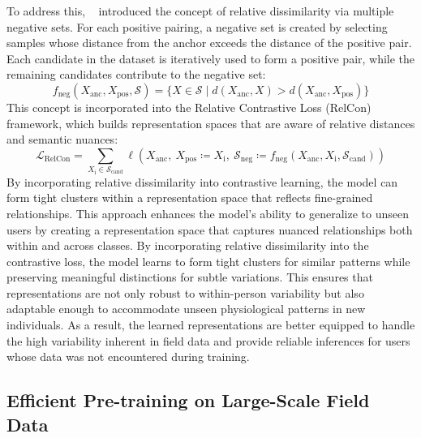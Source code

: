 To address this, ~\cite{xu2024relcon} introduced the concept of relative dissimilarity via multiple negative sets. For each positive pairing, a negative set is created by selecting samples whose distance from the anchor exceeds the distance of the positive pair. Each candidate in the dataset is iteratively used to form a positive pair, while the remaining candidates contribute to the negative set:
\[
f_{\textrm{neg}}({X}_{\textrm{anc}}, {X}_{\textrm{pos}}, \mathcal{S}) = \{{X} \in \mathcal{S} \mid d({X}_{\textrm{anc}}, {X}) > d({X}_{\textrm{anc}}, {X}_{\textrm{pos}}) \}
\]
This concept is incorporated into the Relative Contrastive Loss (RelCon) framework, which builds representation spaces that are aware of relative distances and semantic nuances:
\[
\mathcal{L}_{\textrm{RelCon}} = \sum_{{X}_{\textrm{i}} \in \mathcal{S}_{\textrm{cand}}} \ell({X}_{\textrm{anc}},\ {X}_{\textrm{pos}} \coloneqq {X}_{\textrm{i}},\ \mathcal{S}_{\textrm{neg}} \coloneqq f_{\textrm{neg}}({X}_{\textrm{anc}}, {X}_{\textrm{i}}, \mathcal{S}_{\textrm{cand}}))
\]
By incorporating relative dissimilarity into contrastive learning, the model can form tight clusters within a representation space that reflects fine-grained relationships. This approach enhances the model's ability to generalize to unseen users by creating a representation space that captures nuanced relationships both within and across classes. By incorporating relative dissimilarity into the contrastive loss, the model learns to form tight clusters for similar patterns while preserving meaningful distinctions for subtle variations. This ensures that representations are not only robust to within-person variability but also adaptable enough to accommodate unseen physiological patterns in new individuals. As a result, the learned representations are better equipped to handle the high variability inherent in field data and provide reliable inferences for users whose data was not encountered during training.


\subsection{Efficient Pre-training on Large-Scale Field Data}





